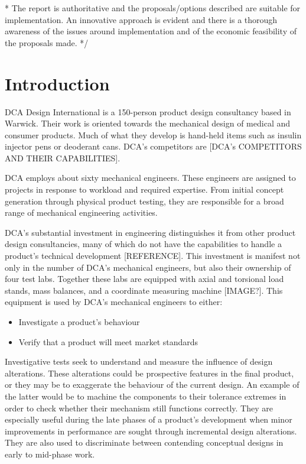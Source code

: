 \documentclass[11pt,a4paper,article]{memoir} %
\begin{document}
\/* The report is authoritative and the proposals/options
described are suitable for implementation. An
innovative approach is evident and there is a
thorough awareness of the issues around
implementation and of the economic feasibility of the
proposals made. */

\newpage
\chapter{Introduction}
DCA Design International is a 150-person product design consultancy based in Warwick. Their work is oriented towards the mechanical design of medical and consumer products. Much of what they develop is hand-held items such as insulin injector pens or deoderant cans. DCA's competitors are [DCA's COMPETITORS AND THEIR CAPABILITIES].
\par
DCA employs about sixty mechanical engineers. These engineers are assigned to projects in response to workload and required expertise. From initial concept generation through physical product testing, they are responsible for a broad range of mechanical engineering activities.
\par
DCA's substantial investment in engineering distinguishes it from other product design consultancies, many of which do not have the capabilities to handle a product's technical development [REFERENCE]. This investment is manifest not only in the number of DCA's mechanical engineers, but also their ownership of four test labs. Together these labs are equipped with axial and torsional load stands, mass balances, and a coordinate measuring machine [IMAGE?]. This equipment is used by DCA's mechanical engineers to either:
\begin{itemize}
	\item Investigate a product's behaviour
	\item Verify that a product will meet market standards
\end{itemize}
Investigative tests seek to understand and measure the influence of design alterations. These alterations could be prospective features in the final product, or they may be to exaggerate the behaviour of the current design. An example of the latter would be to machine the components to their tolerance extremes in order to check whether their mechanism still functions correctly. They are especially useful during the late phases of a product's development when minor improvements in performance are sought through incremental design alterations. They are also used to discriminate between contending conceptual designs in early to mid-phase work.
\end{document}
